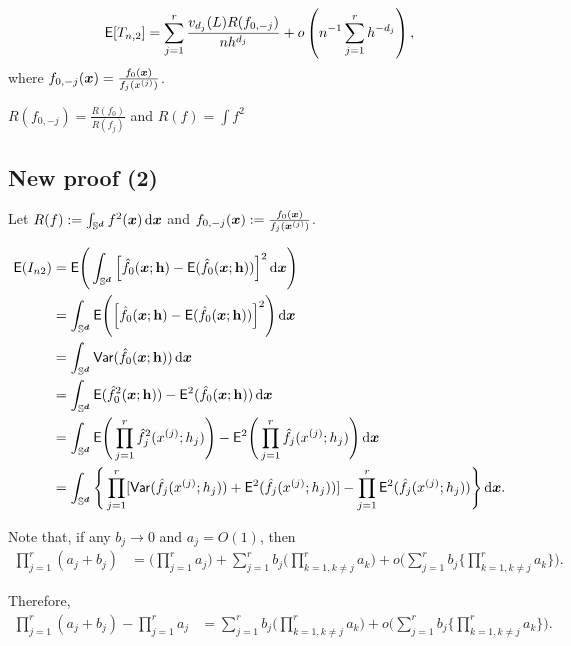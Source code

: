 \documentclass{article}
\begin{document}
\begin{align*}
    \mathsf{E}[T_{n,2}]=\sum_{j=1}^r \frac{v_{d_j}(L)R(f_{0,-j})}{nh^{d_j}}+o\left(n^{-1}\sum_{j=1}^r h^{-d_j}\right),
\end{align*}
where $f_{0,-j}(\boldsymbol{x})=\frac{f_0(\boldsymbol{x})}{f_j(x^{(j)})}$.

$R(f_{0,-j})=\frac{R(f_0)}{R(f_j)}$ and $R(f)=\int f^2 $

\subsection{New proof (2)}

Let $R(f) := \int_{\mathbb{S}^{\boldsymbol{d}}} f^2(\boldsymbol{x}) \,\mathrm{d} \boldsymbol{x}$ and $f_{0,-j}(\boldsymbol{x}) := \frac{f_0(\boldsymbol{x})}{f_j(\boldsymbol{x}^{(j)})}$.

\begin{align*}
        \mathsf{E} (I_{n2}) &= \mathsf{E} \Bigg( \int_{\mathbb{S}^{\boldsymbol{d}}} \Big[ \hat{f}_{0}(\boldsymbol{x};\mathbf h) - \mathsf{E} (\hat{f}_{0}(\boldsymbol{x};\mathbf h)) \Big]^2 \,\mathrm{d} \boldsymbol{x} \Bigg) \\
        &= \int_{\mathbb{S}^{\boldsymbol{d}}} \mathsf{E} \Bigg( \Big[ \hat{f}_{0}(\boldsymbol{x};\mathbf h) - \mathsf{E} (\hat{f}_{0}(\boldsymbol{x};\mathbf h)) \Big]^2 \Bigg) \,\mathrm{d} \boldsymbol{x} \\
        &= \int_{\mathbb{S}^{\boldsymbol{d}}} \mathsf{Var} (\hat{f}_{0}(\boldsymbol{x};\mathbf h)) \,\mathrm{d} \boldsymbol{x} \\
        &= \int_{\mathbb{S}^{\boldsymbol{d}}} \mathsf{E} (\hat{f}_{0}^2(\boldsymbol{x};\mathbf h)) - \mathsf{E}^2 (\hat{f}_{0}(\boldsymbol{x};\mathbf h)) \,\mathrm{d} \boldsymbol{x} \\
        &= \int_{\mathbb{S}^{\boldsymbol{d}}} \mathsf{E} \Bigg(\prod_{j=1}^r \hat{f}_{j}^2(x^{(j)};h_j)\Bigg) - \mathsf{E}^2 \Bigg(\prod_{j=1}^r \hat{f}_{j}(x^{(j)};h_j)\Bigg) \,\mathrm{d} \boldsymbol{x} \\
        &= \int_{\mathbb{S}^{\boldsymbol{d}}} \Bigg\{ \prod_{j=1}^{r} [\mathsf{Var} (\hat{f}_j(x^{(j)};h_j)) + \mathsf{E}^2 (\hat{f}_j(x^{(j)};h_j))] - \prod_{j=1}^{r} \mathsf{E}^2 (\hat{f}_j(x^{(j)};h_j)) \Bigg\} \,\mathrm{d} \boldsymbol{x}.
    \end{align*}

Note that, if any $b_j \to 0$ and $a_j = O(1)$, then
\begin{align*}
    \prod_{j=1}^r (a_j + b_j) &= \Bigg( \prod_{j=1}^{r} a_j\Bigg) + \sum_{j=1}^{r} b_j \Bigg( \prod_{k=1,k \ne j}^{r} a_k \Bigg) + o \Bigg( \sum_{j=1}^{r} b_j \Bigg\{ \prod_{k=1,k \ne j}^{r} a_k\Bigg\}\Bigg).
\end{align*}

Therefore,
\begin{align*}
    \prod_{j=1}^r (a_j + b_j) -  \prod_{j=1}^r a_j &= \sum_{j=1}^{r} b_j \Bigg( \prod_{k=1,k \ne j}^{r} a_k \Bigg) + o \Bigg( \sum_{j=1}^{r} b_j \Bigg\{ \prod_{k=1,k \ne j}^{r} a_k \Bigg\}\Bigg).
\end{align*}
\end{document}
